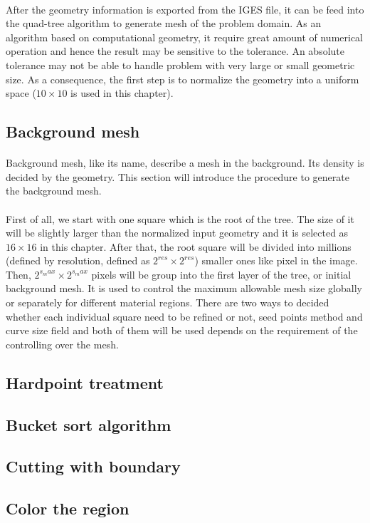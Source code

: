\paragraph{}
After the geometry information is exported from the IGES file, it can be feed into the quad-tree algorithm to generate mesh of the problem domain.
As an algorithm based on computational geometry, it require great amount of numerical operation and hence the result may be sensitive to the tolerance.
An absolute tolerance may not be able to handle problem with very large or small geometric size.
As a consequence, the first step is to normalize the geometry into a uniform space ($10\times10$ is used in this chapter).

\subsection{Background mesh}
\paragraph{}
Background mesh, like its name, describe a mesh in the background. %
Its density is decided by the geometry.
This section will introduce the procedure to generate the background mesh.
\paragraph{}
First of all, we start with one square which is the root of the tree.
The size of it will be slightly larger than the normalized input geometry and it is selected as $16 \times 16$ in this chapter.
After that, the root square will be divided into millions (defined by resolution, defined as $2^{res} \times 2^{res}$) smaller ones like pixel in the image.
Then, $2^{s_max} \times 2^{s_max}$ pixels will be group into the first layer of the tree, or initial background mesh.
It is used to control the maximum allowable mesh size globally or separately for different material regions.
There are two ways to decided whether each individual square need to be refined or not, seed points method and curve size field and both of them will be used depends on the requirement of the controlling over the mesh.

\paragraph{}


\subsection{Hardpoint treatment}

\subsection{Bucket sort algorithm}

\subsection{Cutting with boundary}

\subsection{Color the region}
